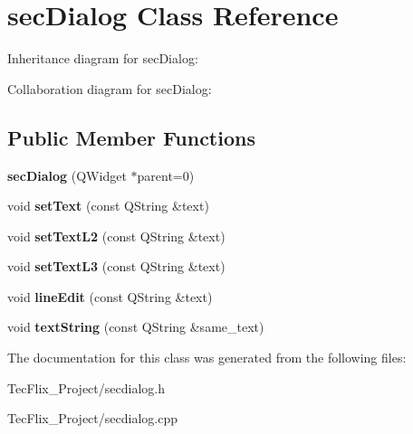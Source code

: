 \hypertarget{classsecDialog}{}\section{sec\+Dialog Class Reference}
\label{classsecDialog}


Inheritance diagram for sec\+Dialog\+:


Collaboration diagram for sec\+Dialog\+:
\subsection*{Public Member Functions}
\begin{DoxyCompactItemize}
\item 
\mbox{\label{classsecDialog_aea2affb0f7261bff48540d55c0fc70c9}} 
{\bfseries sec\+Dialog} (Q\+Widget $\ast$parent=0)
\item 
\mbox{\label{classsecDialog_a921ab286bedf595db8afe25c32997432}} 
void {\bfseries set\+Text} (const Q\+String \&text)
\item 
\mbox{\label{classsecDialog_aba168ba286d3fa22a0c8270310b80918}} 
void {\bfseries set\+Text\+L2} (const Q\+String \&text)
\item 
\mbox{\label{classsecDialog_a9d051d95afa1fb5f1902d33865b15204}} 
void {\bfseries set\+Text\+L3} (const Q\+String \&text)
\item 
\mbox{\label{classsecDialog_abcb6ebaa2b276397eec17c9dae4f75e0}} 
void {\bfseries line\+Edit} (const Q\+String \&text)
\item 
\mbox{\label{classsecDialog_a6bae2447c624b05f02a148a9d0eae052}} 
void {\bfseries text\+String} (const Q\+String \&same\+\_\+text)
\end{DoxyCompactItemize}


The documentation for this class was generated from the following files\+:\begin{DoxyCompactItemize}
\item 
Tec\+Flix\+\_\+\+Project/secdialog.\+h\item 
Tec\+Flix\+\_\+\+Project/secdialog.\+cpp\end{DoxyCompactItemize}
